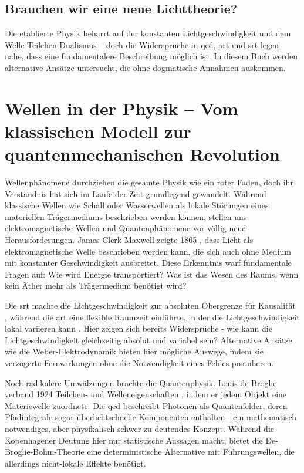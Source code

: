 \subsection{Brauchen wir eine neue Lichttheorie?}
Die etablierte Physik beharrt auf der konstanten Lichtgeschwindigkeit und dem Welle-Teilchen-Dualismus – doch die Widersprüche in \gls{qed}, \gls{art} und \gls{srt} legen nahe,
dass eine fundamentalere Beschreibung möglich ist. In diesem Buch werden alternative Ansätze untersucht, die ohne dogmatische Annahmen auskommen.

\section{Wellen in der Physik – Vom klassischen Modell zur quantenmechanischen Revolution}
Wellenphänomene durchziehen die gesamte Physik wie ein roter Faden, doch ihr Verständnis hat sich im Laufe der Zeit grundlegend gewandelt. Während klassische Wellen wie Schall
oder Wasserwellen als lokale Störungen eines materiellen Trägermediums beschrieben werden können, stellen uns elektromagnetische Wellen und Quantenphänomene vor völlig neue
Herausforderungen. James Clerk Maxwell zeigte 1865 \cite{Maxwell1865}, dass Licht als elektromagnetische Welle beschrieben werden kann, die sich auch ohne Medium mit konstanter
Geschwindigkeit ausbreitet. Diese Erkenntnis warf fundamentale Fragen auf: Wie wird Energie transportiert? Was ist das Wesen des Raums, wenn kein Äther mehr als Trägermedium benötigt wird?

Die \gls{srt} machte die Lichtgeschwindigkeit zur absoluten Obergrenze für Kausalität \cite{Einstein1905}, während die \gls{art} eine flexible Raumzeit einführte, in der die
Lichtgeschwindigkeit lokal variieren kann \cite{MisnerThorneWheeler1973}. Hier zeigen sich bereits Widersprüche \cite{Cahill2005} - wie kann die Lichtgeschwindigkeit gleichzeitig absolut und variabel sein?
Alternative Ansätze wie die Weber-Elektrodynamik \cite{Weber1846, WeberElectrodynamics} bieten hier mögliche Auswege, indem sie verzögerte Fernwirkungen ohne die Notwendigkeit eines
Feldes postulieren.

Noch radikalere Umwälzungen brachte die Quantenphysik. Louis de Broglie verband 1924 Teilchen- und Welleneigenschaften \cite{deBroglie1924}, indem er jedem Objekt eine Materiewelle zuordnete.
Die \gls{qed} beschreibt Photonen als Quantenfelder, deren Pfadintegrale sogar überlichtschnelle Komponenten enthalten \cite{FeynmanQED} - ein mathematisch notwendiges,
aber physikalisch schwer zu deutendes Konzept. Während die Kopenhagener Deutung hier nur statistische Aussagen macht, bietet die De-Broglie-Bohm-Theorie \cite{bohm1952} eine deterministische
Alternative mit Führungswellen, die allerdings nicht-lokale Effekte benötigt.

